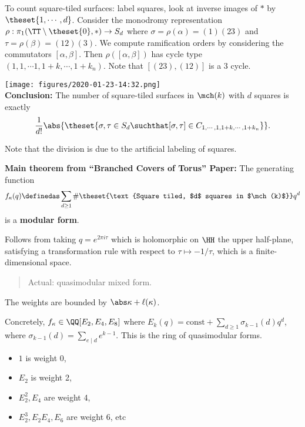 To count square-tiled surfaces: label squares, look at inverse images of
\(\ast\) by \(\theset{1 ,\cdots, d}\). Consider the monodromy
representation \(\rho: \pi_1( \TT \setminus \theset{0}, \ast ) \to S_d\)
where \(\sigma = \rho(\alpha) = (1)(23)\) and
\(\tau = \rho(\beta) = (12)(3)\). We compute ramification orders by
considering the commutators \([\alpha, \beta]\). Then
\(\rho([\alpha, \beta] )\) has cycle type
\((1, 1, \cdots 1, 1+k, \cdots, 1+ k_n)\). Note that \([(23), (12)]\) is
a 3 cycle.

\texttt{[image: figures/2020-01-23-14:32.png]}\\

\textbf{Conclusion:} The number of square-tiled surfaces in \(\mch(k)\)
with \(d\) squares is exactly
\begin{align*}
\frac{1}{d!} \abs{\theset{\sigma, \tau \in S_d \suchthat [\sigma, \tau] \in C_{1, \cdots, 1, 1+k, \cdots, 1+ k_n}}}
.\end{align*}

Note that the division is due to the artificial labeling of squares.

\textbf{Main theorem from ``Branched Covers of Torus'' Paper:} The
generating function
\begin{align*}
f_\kappa(q)\definedas \sum_{d\geq 1} \#\theset{\text{Square tiled, $d$ squares in $\mch(k)$}} q^d
\end{align*} is a \textbf{modular form}.

Follows from taking \(q = e^{2\pi i \tau}\) which is holomorphic on
\(\HH\) the upper half-plane, satisfying a transformation rule with
respect to \(\tau \mapsto -1/\tau\), which is a finite-dimensional
space.

\begin{quote}
Actual: quasimodular mixed form.
\end{quote}

The weights are bounded by \(\abs \kappa + \ell(\kappa)\).

Concretely, \(f_\kappa \in \QQ[E_2, E_4, E_8]\) where
\(E_k(q) = \text{const} + \sum_{d \geq 1} \sigma_{k-1}(d) q^d\), where
\(\sigma_{k-1}(d) = \sum_{e\mid d} e^{k-1}\). This is the ring of
quasimodular forms.

\begin{itemize}
\tightlist
\item
  \(1\) is weight 0,
\item
  \(E_2\) is weight 2,
\item
  \(E_2^2, E_4\) are weight 4,
\item
  \(E_2^3, E_2 E_4, E_6\) are weight 6, etc
\end{itemize}

